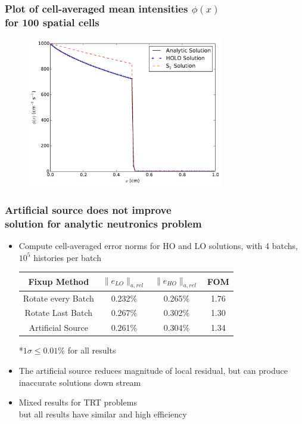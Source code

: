 \documentclass[xcolor=dvipsnames,hyperref={pdfpagelabels=false},unknownkeysallowed]{beamer}
\newcommand{\colb}[1]{{\color{blue} #1}}
\newcommand{\colG}[1]{{\color{Gray!110} #1}}
\newlength{\wideitemsep}
\let\olditem\item
\renewcommand{\item}{\setlength{\itemsep}{\wideitemsep}\olditem}
\begin{document}
\begin{frame}
\begin{columns}
\begin{column}{0.5\textwidth}
    \end{column}
\end{columns}
\end{frame}

\begin{frame}
    \frametitle{Plot of cell-averaged mean intensities $\phi(x)$ \\ for 100 spatial cells}
    \begin{figure}
        \vspace{-0.1in} \includegraphics[width=0.76099\textwidth]{neut_analytic_phi.pdf}
    \centering
    \end{figure}
\end{frame}

\begin{frame}
    \frametitle{Artificial source does not improve \\ solution for analytic neutronics problem}
    \begin{itemize}
        \item Compute cell-averaged error norms for HO and LO solutions, with \colb{4
            batchs, $10^5$ histories per batch}
            \vspace{0.2in}
\begin{table}
    \begin{tabular}{c|ccc} \hline
      Fixup  Method & \multicolumn{1}{|c}{$\|e_{LO}\|_{a,rel}$} & 
        \multicolumn{1}{c}{$\|e_{HO}\|_{a,rel}$} &\multicolumn{1}{c}{FOM}
        \\ \hline
 Rotate every Batch &0.232\%       & 0.265\%   & 1.76  \\  
   Rotate Last Batch &0.267\%      & 0.302\%   & 1.30  \\ \hline 
     Artificial Source &0.261\%    & 0.304\%   & 1.34  \\  \hline
    \end{tabular}
        \colG{*$1\sigma \leq 0.01 \%$ for all results}
\end{table}
    \item The artificial source reduces magnitude of local residual,
        but can produce inaccurate solutions down stream 
    \item Mixed results for TRT problems \\ \colG{but all results have similar and high efficiency}
    \end{itemize}
\end{frame}
\end{document}
